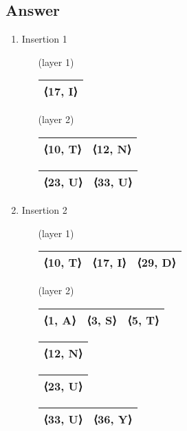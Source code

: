 \documentclass{article}
\begin{document}
\subsection{Answer}
\begin{enumerate}
    \item Insertion 1
    \begin{enumerate}
        \item [(layer 1)]
            \begin{tabular}{|c|}
                \hline
                 ⟨17, I⟩ \\
                 \hline
            \end{tabular} \;
        \item [(layer 2)]
            \begin{tabular}{|c|c|}
                \hline
                 ⟨10, T⟩ & ⟨12, N⟩ \\
                \hline
            \end{tabular} \;
            \begin{tabular}{|c|c|}
                \hline
                 ⟨23, U⟩ & ⟨33, U⟩ \\
                \hline
            \end{tabular} \;
    \end{enumerate}
    
    \item Insertion 2
    \begin{enumerate}
        \item [(layer 1)]
            \begin{tabular}{|c|c|c|}
                \hline
                 ⟨10, T⟩ & ⟨17, I⟩ & ⟨29, D⟩ \\
                 \hline
            \end{tabular} \;
        \item [(layer 2)]
            \begin{tabular}{|c|c|c|}
                \hline
                 ⟨1, A⟩ & ⟨3, S⟩ & ⟨5, T⟩ \\
                \hline
            \end{tabular} \;
            \begin{tabular}{|c|}
                \hline
                 ⟨12, N⟩ \\
                \hline
            \end{tabular} \;
            \begin{tabular}{|c|}
                \hline
                    ⟨23, U⟩ \\
                \hline
            \end{tabular} \;
            \begin{tabular}{|c|c|}
                \hline
                    ⟨33, U⟩ & ⟨36, Y⟩ \\
                \hline
            \end{tabular} \;
    \end{enumerate}
    

\end{enumerate}
\end{document}
